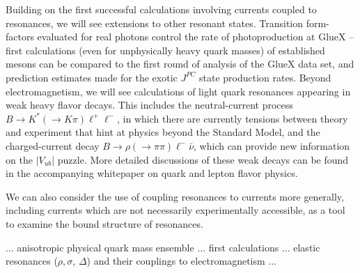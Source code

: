 {Building on the first successful calculations involving currents coupled to resonances, we will see extensions to other resonant states. Transition form-factors evaluated for real photons control the rate of photoproduction at GlueX -- first calculations (even for unphysically heavy quark masses) of established mesons can be compared to the first round of analysis of the GlueX data set, and prediction estimates made for the exotic $J^{PC}$ state production rates. Beyond electromagnetism, we will see calculations of light quark resonances appearing in weak heavy flavor decays. This includes the neutral-current process $B \to K^*(\to K\pi)\ell^+\ell^-$, in which there are currently tensions between theory and experiment that hint at physics beyond the Standard Model, and the charged-current decay $B \to \rho (\to\pi\pi)\ell^-\bar{\nu}$, which can provide new information on the $|V_{ub}|$ puzzle. More detailed discussions of these weak decays can be found in
the accompanying whitepaper on quark and lepton flavor physics.

We can also consider the use of coupling resonances to currents more generally, including currents which are not necessarily experimentally accessible, as a tool to examine the bound structure of resonances. %



... anisotropic physical quark mass ensemble ... first calculations ... elastic resonances ($\rho, \sigma$, $\Delta$) and their couplings to electromagnetism ... 

}
